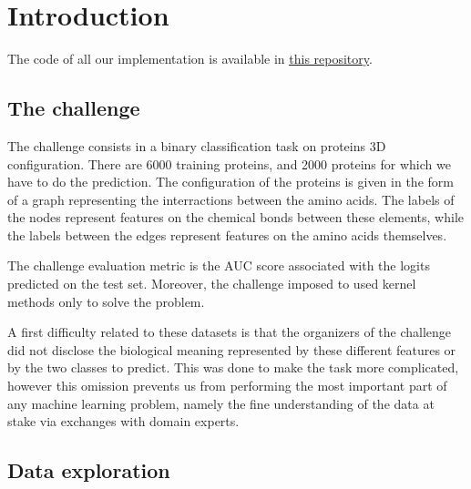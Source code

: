 \documentclass[sigconf, nonacm]{acmart}
\begin{document}


\maketitle

\section{Introduction}

The code of all our implementation is available in \href{https://github.com/DentanJeremie/kernel-proteins}{\underline{this repository}}.

\subsection{The challenge}

The challenge consists in a binary classification task on proteins 3D configuration. There are 6000 training proteins, and 2000 proteins for which we have to do the prediction. The configuration of the proteins is given in the form of a graph representing the interractions between the amino acids. The labels of the nodes represent features on the chemical bonds between these elements, while the labels between the edges represent features on the amino acids themselves. 

The challenge evaluation metric is the AUC score associated with the logits predicted on the test set. Moreover, the challenge imposed to used kernel methods only to solve the problem.

A first difficulty related to these datasets is that the organizers of the challenge did not disclose the biological meaning represented by these different features or by the two classes to predict. This was done to make the task more complicated, however this omission prevents us from performing the most important part of any machine learning problem, namely the fine understanding of the data at stake via exchanges with domain experts.

\subsection{Data exploration}
\end{document}
